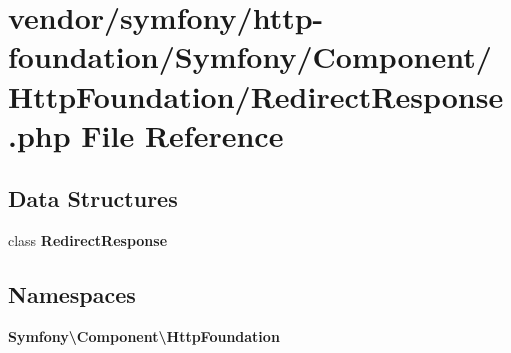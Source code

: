 \section{vendor/symfony/http-\/foundation/\+Symfony/\+Component/\+Http\+Foundation/\+Redirect\+Response.php File Reference}
\label{symfony_2http-foundation_2_symfony_2_component_2_http_foundation_2_redirect_response_8php}
\subsection*{Data Structures}
\begin{DoxyCompactItemize}
\item 
class {\bf Redirect\+Response}
\end{DoxyCompactItemize}
\subsection*{Namespaces}
\begin{DoxyCompactItemize}
\item 
 {\bf Symfony\textbackslash{}\+Component\textbackslash{}\+Http\+Foundation}
\end{DoxyCompactItemize}
